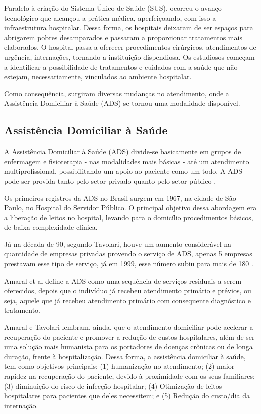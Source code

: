 Paralelo à criação do Sistema Único de Saúde (SUS), ocorreu o avanço tecnológico
que alcançou a prática médica, aperfeiçoando, com isso a infraestrutura
hospitalar. Dessa forma, os hospitais deixaram de ser espaços para abrigarem
pobres desamparados e passaram a proporcionar tratamentos mais elaborados. O
hospital passa a oferecer  procedimentos cirúrgicos, atendimentos de urgência,
internações, tornando a instituição dispendiosa. Os estudiosos começam a
identificar a possibilidade de tratamentos e cuidados com a  saúde que não
estejam, necessariamente, vinculados ao ambiente hospitalar.

Como consequência, surgiram diversas mudanças no atendimento, onde a Assistência
Domiciliar à Saúde (ADS) se tornou uma modalidade disponível.

\subsection{Assistência Domiciliar à Saúde}
\label{subsec:assistencia-domiciliar-a-saude}

A Assistência Domiciliar à Saúde (ADS) divide-se basicamente em grupos de
enfermagem e fisioterapia - nas modalidades mais básicas - até um atendimento
multiprofissional, possibilitando um apoio ao paciente como um todo. A ADS pode
ser provida tanto pelo setor privado quanto pelo setor público
\cite{amaral2001assistencia}.

Os primeiros registros da ADS no Brasil surgem em 1967, na cidade de São
Paulo, no Hospital do Servidor Público. O principal objetivo dessa abordagem
era a liberação de leitos no hospital, levando para o domicílio procedimentos
básicos, de baixa complexidade clínica.

Já na década de 90, segundo Tavolari, houve um aumento considerável na
quantidade de empresas privadas provendo o serviço de ADS, apenas 5 empresas
prestavam esse tipo de  serviço, já em 1999, esse número subiu para mais de 180
\cite{tavolari2000desenvolvimento}.

Amaral et al define a ADS como uma sequência de serviços residuais a serem
oferecidos, depois que o indivíduo já recebeu atendimento primário e prévios,
ou seja, aquele que já recebeu atendimento primário com consequente diagnóstico
e tratamento.

Amaral e Tavolari lembram, ainda, que o atendimento domiciliar pode acelerar a
recuperação do  paciente e promover a redução de custos hospitalares, além de
ser uma solução mais  humanista para os portadores de doenças crônicas ou de
longa duração, frente à  hospitalização. Dessa forma, a assistência domiciliar à
saúde, tem como objetivos principais: (1) humanização no atendimento; (2) maior
rapidez na recuperação do paciente, devido à proximidade com os seus familiares;
(3) diminuição do risco de infecção hospitalar; (4) Otimização de leitos
hospitalares para pacientes que deles necessitem; e (5) Redução do custo/dia da
internação.

